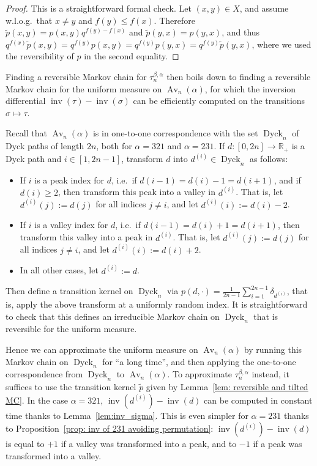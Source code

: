 \documentclass[a4paper,11pt]{amsart}
\newcommand{\R}{\mathbb R}
\DeclareMathOperator{\Av}{Av}
\DeclareMathOperator{\inv}{inv}
\DeclareMathOperator{\Dyck}{Dyck}
\theoremstyle{definition}
\begin{document}
\begin{proof}
    This is a straightforward formal check.
    Let $(x,y)\in X$, and assume w.l.o.g.~that $x\ne y$ and $f(y)\le f(x)$.
    Therefore $\tilde p(x,y) = p(x,y)q^{f(y)-f(x)}$ and $\tilde p(y,x) = p(y,x)$, and thus $q^{f(x)}\tilde p(x,y) = q^{f(y)} p(x,y) = q^{f(y)} p(y,x) = q^{f(y)}\tilde p(y,x)$, where we used the reversibility of $p$ in the second equality.
\end{proof}

Finding a reversible Markov chain for $\tau_n^{\beta, \alpha}$ then boils down to finding a reversible Markov chain for the uniform measure on $\Av_n(\alpha)$, for which the inversion differential $\inv(\tau) - \inv(\sigma)$ can be efficiently computed on the transitions $\sigma \mapsto \tau$.

Recall that $\Av_n(\alpha)$ is in one-to-one correspondence with the set $\Dyck_n$ of Dyck paths of length $2n$, both for $\alpha=321$ and $\alpha=231$.
If $d : [0,2n] \to \R_+$ is a Dyck path and $i\in [1,2n-1]$, transform $d$ into $d^{(i)} \in \Dyck_n$ as follows:
\begin{itemize}
    \item If $i$ is a peak index for $d$, i.e.~if $d(i-1) = d(i)-1 = d(i+1)$, and if $d(i)\ge2$, then transform this peak into a valley in $d^{(i)}$.
    That is, let $d^{(i)}(j) := d(j)$ for all indices $j\ne i$, and let $d^{(i)}(i) := d(i)-2$.
    \item If $i$ is a valley index for $d$, i.e.~if $d(i-1) = d(i)+1 = d(i+1)$, then transform this valley into a peak in $d^{(i)}$.
    That is, let $d^{(i)}(j) := d(j)$ for all indices $j\ne i$, and let $d^{(i)}(i) := d(i)+2$.
    \item In all other cases, let $d^{(i)} := d$.
\end{itemize}
Then define a transition kernel on $\Dyck_n$ via $p(d,\cdot) = \frac{1}{2n-1} \sum_{i=1}^{2n-1} \delta_{d^{(i)}}$, that is, apply the above transform at a uniformly random index.
It is straightforward to check that this defines an irreducible Markov chain on $\Dyck_n$ that is reversible for the uniform measure.

Hence we can approximate the uniform measure on $\Av_n(\alpha)$ by running this Markov chain on $\Dyck_n$ for ``a long time'', and then applying the one-to-one correspondence from $\Dyck_n$ to $\Av_n(\alpha)$.
To approximate $\tau_n^{\beta,\alpha}$ instead, it suffices to use the transition kernel $\tilde p$ given by Lemma~\ref{lem: reversible and tilted MC}.
In the case $\alpha=321$, $\inv(d^{(i)}) - \inv(d)$ can be computed in constant time thanks to Lemma~\ref{lem:inv_sigma}.
This is even simpler for $\alpha=231$ thanks to Proposition~\ref{prop: inv of 231 avoiding permutation}: $\inv(d^{(i)}) - \inv(d)$ is equal to $+1$ if a valley was transformed into a peak, and to $-1$ if a peak was transformed into a valley.
\end{document}
